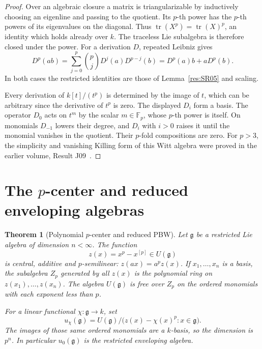 \documentclass[11pt,oneside,openany]{book}
\newtheorem{theorem}{Theorem}[chapter]
\theoremstyle{definition}
\theoremstyle{remark}
\begin{document}
\begin{proof}
Over an algebraic closure a matrix is triangularizable by
inductively choosing an eigenline and passing to the quotient.
Its \(p\)-th power has the \(p\)-th powers of its eigenvalues
on the diagonal. Thus
\(\operatorname{tr}(X^p)=\operatorname{tr}(X)^p\), an identity
which holds already over \(k\). The traceless Lie subalgebra
is therefore closed under the power. For a derivation \(D\),
repeated Leibniz gives
\[
 D^p(ab)=\sum_{j=0}^p\binom pj D^j(a)D^{p-j}(b)
         =D^p(a)b+aD^p(b).
\]
In both cases the restricted identities are those of
Lemma~\ref{res:SR05} and scaling.

Every derivation of \(k[t]/(t^p)\) is determined by the
image of \(t\), which can be arbitrary since the derivative
of \(t^p\) is zero. The displayed \(D_i\) form a basis.
The operator \(D_0\) acts on \(t^m\) by the scalar
\(m\in\mathbb F_p\), whose \(p\)-th power is itself.
On monomials \(D_{-1}\) lowers their degree, and \(D_i\)
with \(i>0\) raises it until the monomial vanishes in
the quotient. Their \(p\)-fold compositions are zero.
For \(p>3\), the simplicity and vanishing Killing form
of this Witt algebra were proved in the earlier volume,
Result J09~\cite[PDF p.~72]{mg-lie}.
\end{proof}

\section{The \texorpdfstring{\(p\)}{p}-center and reduced enveloping algebras}

\begin{theorem}[Polynomial \(p\)-center and reduced PBW]
\label{res:SR08}
Let \(\mathfrak g\) be a restricted Lie algebra of dimension
\(n<\infty\). The function
\[
 z(x)=x^p-x^{[p]}\in U(\mathfrak g)
\]
is central, additive and \(p\)-semilinear:
\(z(a x)=a^p z(x)\). If \(x_1,\ldots,x_n\) is a basis,
the subalgebra \(Z_p\) generated by all \(z(x)\) is the
polynomial ring on \(z(x_1),\ldots,z(x_n)\).
The algebra \(U(\mathfrak g)\) is free over \(Z_p\) on the
ordered monomials with each exponent less than \(p\).

For a linear functional \(\chi:\mathfrak g\to k\), set
\[
 u_\chi(\mathfrak g)
   = U(\mathfrak g)\big/\bigl(z(x)-\chi(x)^p:x\in\mathfrak g\bigr).
\]
The images of those same ordered monomials are a
\(k\)-basis, so the dimension is \(p^n\). In particular
\(u_0(\mathfrak g)\) is the restricted enveloping algebra.
\end{theorem}
\end{document}
